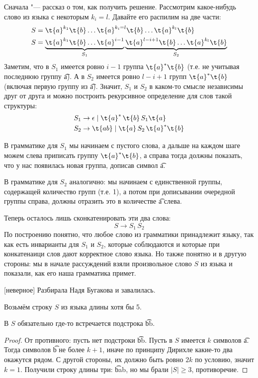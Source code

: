 	Сначала "--- рассказ о том, как получить решение.
	Рассмотрим какое-нибудь слово из языка с некоторым $k_i=l$.
	Давайте его распилим на две части:
	\begin{align*}
		S &= \t{a}^{k_1}\t{b}\dots \t{a}^{k_i=l} \t{b} \dots \t{a}^{k_l} \t{b} \\
		S &= \underbrace{\t{a}^{k_1}\t{b}\dots \t{a}^{i-1}}_{S_1} \underbrace{\t{a}^{l-i+1} \t{b} \dots \t{a}^{k_l} \t{b}}_{S_2}
	\end{align*}
	Заметим, что в $S_1$ имеется ровно $i-1$ группа $\t{a}^*\t{b}$ (т.е. не учитывая последнюю группу \t{a}).
	А в $S_2$ имеется ровно $l-i+1$ групп $\t{a}^*\t{b}$ (включая первую группу из \t{a}).
	Значит, $S_1$ и $S_2$ в каком-то смысле независимы друг от друга и можно построить рекурсивное определение для слов такой структуры:
	\begin{align*}
		S_1 &\to \epsilon \mid \t{a}^*\,\t{b}\,S_1\t{a} \\
		S_2 &\to \t{ab} \mid \t{a}\,S_2\,\t{a}^*\t{b}
	\end{align*}

	В грамматике для $S_1$ мы начинаем с пустого слова, а дальше на каждом шаге можем слева приписать группу $\t{a}^*\t{b}$, а справа тогда
	должны показать, что у нас появилась новая группа, дописав символ \t{a}.

	В грамматике для $S_2$ аналогично: мы начинаем с единственной группы, содержащей количество групп (т.е. 1), а потом при дописывании очередной группы
	справа, должны отразить это в количестве \t{a} слева.

	Теперь осталось лишь сконкатенировать эти два слова:
	\[
		S \to S_1\, S_2
	\]
	По построению понятно, что любое слово из грамматики принадлежит языку, так как есть инварианты для $S_1$ и $S_2$, которые соблюдаются и которые
	при конкатенаици слов дают корректное слово языка.
	Но также понятно и в другую стороны: мы в начале рассуждений взяли произвольное слово $S$ из языка и показали, как его наша грамматика примет.

[неверное]\label{prob22f_wrong}
	Разбирала Надя Бугакова и завалилась.

	Возьмём строку $S$ из языка длины хотя бы 5.
	\begin{lemma}
		В $S$ обязательно где-то встречается подстрока \t{bb}.
	\end{lemma}
	\begin{proof}
		От противного: пусть нет подстроки \t{bb}.
		Пусть в $S$ имеется $k$ символов \t{a}.
		Тогда символов \t{b} не более $k+1$, иначе по принципу Дирихле какие-то два окажутся рядом.
		С другой стороны, их должно быть ровно $2k$ по условию, значит $k=1$.
		Получили строку длины три: \t{bab}, но мы брали $|S|\ge3$, противоречие.
	\end{proof}

